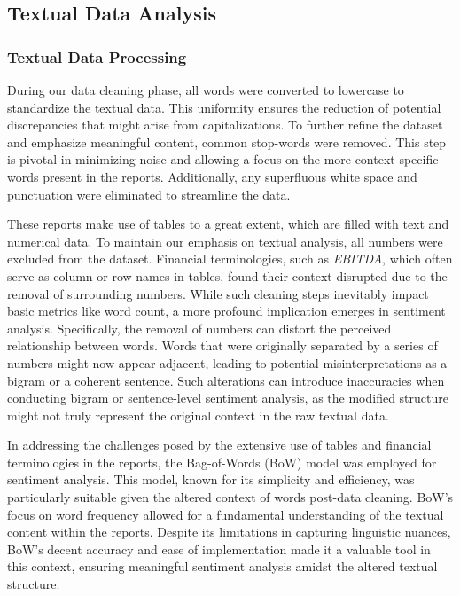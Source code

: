 


\subsection{Textual Data Analysis}

\subsubsection{Textual Data Processing}
During our data cleaning phase, all words were converted to lowercase to standardize the textual data. This uniformity ensures the reduction of potential discrepancies that might arise from capitalizations. To further refine the dataset and emphasize meaningful content, common stop-words were removed. This step is pivotal in minimizing noise and allowing a focus on the more context-specific words present in the reports. Additionally, any superfluous white space and punctuation were eliminated to streamline the data.

These reports make use of tables to a great extent, which are filled with text and numerical data. To maintain our emphasis on textual analysis, all numbers were excluded from the dataset. Financial terminologies, such as \textit{EBITDA}, which often serve as column or row names in tables, found their context disrupted due to the removal of surrounding numbers. While such cleaning steps inevitably impact basic metrics like word count, a more profound implication emerges in sentiment analysis. Specifically, the removal of numbers can distort the perceived relationship between words. Words that were originally separated by a series of numbers might now appear adjacent, leading to potential misinterpretations as a bigram or a coherent sentence. Such alterations can introduce inaccuracies when conducting bigram or sentence-level sentiment analysis, as the modified structure might not truly represent the original context in the raw textual data. 

In addressing the challenges posed by the extensive use of tables and financial terminologies in the reports, the Bag-of-Words (BoW) model was employed for sentiment analysis. This model, known for its simplicity and efficiency, was particularly suitable given the altered context of words post-data cleaning. BoW's focus on word frequency allowed for a fundamental understanding of the textual content within the reports. Despite its limitations in capturing linguistic nuances, BoW's decent accuracy and ease of implementation made it a valuable tool in this context, ensuring meaningful sentiment analysis amidst the altered textual structure.

